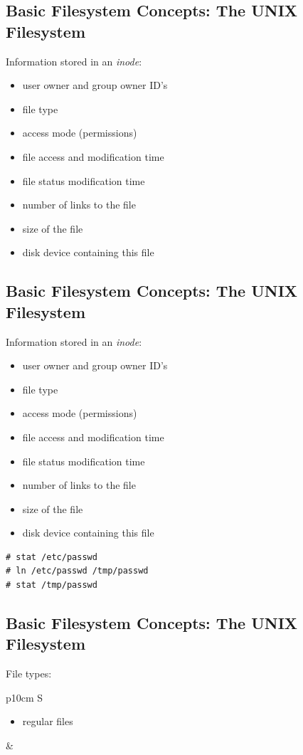 \documentclass[xga]{xdvislides}
\begin{document}
\subsection{Basic Filesystem Concepts: The UNIX Filesystem}
Information stored in an {\em inode}:
\begin{itemize}
	\item user owner and group owner ID's
	\item file type
	\item access mode (permissions)
	\item file access and modification time
	\item file status modification time
	\item number of links to the file
	\item size of the file
	\item disk device containing this file
\end{itemize}

\subsection{Basic Filesystem Concepts: The UNIX Filesystem}
Information stored in an {\em inode}:
\begin{itemize}
	\item user owner and group owner ID's
	\item file type
	\item access mode (permissions)
	\item file access and modification time
	\item file status modification time
	\item number of links to the file
	\item size of the file
	\item disk device containing this file
\end{itemize}

\begin{verbatim}
# stat /etc/passwd
# ln /etc/passwd /tmp/passwd
# stat /tmp/passwd
\end{verbatim}

\subsection{Basic Filesystem Concepts: The UNIX Filesystem}
File types:
\\

\begin{tabular}{ p{10cm} S }
\begin{itemize}
	\item regular files
\end{itemize}
&  \\
\end{tabular}
\\
\end{document}

